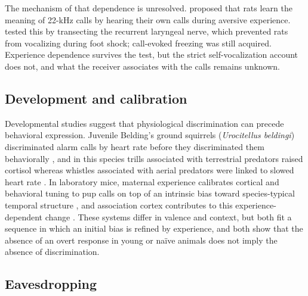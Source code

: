 The mechanism of that dependence is unresolved. \citet{ParsanaEtAl2012b} proposed that rats learn the meaning of 22-kHz calls by hearing their own calls during aversive experience.
\citet{CalubEtAl2018} tested this by transecting the recurrent laryngeal nerve, which prevented rats from vocalizing during foot shock; call-evoked freezing was still acquired. Experience dependence survives the test, but the strict self-vocalization account does not, and what the receiver associates with the calls remains unknown.

\subsection{Development and calibration}
\label{sec:q2-development}

Developmental studies suggest that physiological discrimination can precede behavioral expression. Juvenile Belding's ground squirrels (\textit{Urocitellus beldingi}) discriminated alarm calls by heart rate before they discriminated them behaviorally \citep{Mateo1996}, and in this species trills associated with terrestrial predators raised cortisol whereas whistles associated with aerial predators were linked to slowed heart rate \citep{Mateo2010}.
In laboratory mice, maternal experience calibrates cortical and behavioral tuning to pup calls on top of an intrinsic bias toward species-typical temporal structure \citep{SchiavoEtAl2020}, and association cortex contributes to this experience-dependent change \citep{TasakaEtAl2020}.
These systems differ in valence and context, but both fit a sequence in which an initial bias is refined by experience, and both show that the absence of an overt response in young or naïve animals does not imply the absence of discrimination.

\subsection{Eavesdropping}
\label{sec:q2-eavesdropping}

